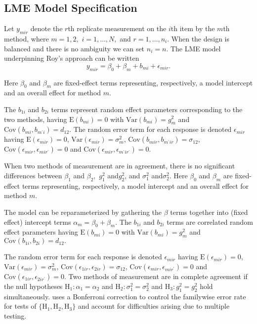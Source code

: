 \documentclass[12pt, a4paper]{report}
\theoremstyle{plain}
\theoremstyle{definition}
\theoremstyle{remark}
\begin{document}
	
	

	
	
	
	
	\subsection{LME Model Specification}
	
	Let $y_{mir} $ denote the $r$th replicate measurement on the $i$th item by the $m$th method, where $m=1,2,$ $i=1,\ldots,N,$ and $r = 1,\ldots,n_i.$ When the design is balanced and there is no ambiguity we can set $n_i=n.$ The LME model underpinning Roy's approach can be written
	\begin{equation}\label{Roy-model}
	y_{mir} = \beta_{0} + \beta_{m} + b_{mi} + \epsilon_{mir}.
	\end{equation}
	
	Here $\beta_0$ and $\beta_m$ are fixed-effect terms representing, respectively, a model intercept and an overall effect for method $m.$ 
	
	The $b_{1i}$ and $b_{2i}$ terms represent random effect parameters corresponding to the two methods, having $\mathrm{E}(b_{mi})=0$ with $\mathrm{Var}(b_{mi})=g^2_m$ and $\mathrm{Cov}(b_{mi}, b_{m^\prime i})=d_{12}.$ The random error term for each response is denoted $\epsilon_{mir}$ having $\mathrm{E}(\epsilon_{mir})=0$, $\mathrm{Var}(\epsilon_{mir})=\sigma^2_m$, $\mathrm{Cov}(b_{mir}, b_{m^\prime ir})=\sigma_{12}$, $\mathrm{Cov}(\epsilon_{mir}, \epsilon_{mir^\prime})= 0$ and $\mathrm{Cov}(\epsilon_{mir}, \epsilon_{m^\prime ir^\prime})= 0.$
	
	
	When two methods of measurement are in agreement, there is no significant differences between $\beta_1$ and $\beta_2,$ $g^2_1 $ and$ g^2_2$, and $\sigma^2_1 $ and$ \sigma^2_2$.
	Here $\beta_0$ and $\beta_m$ are fixed-effect terms representing, respectively, a model intercept and an overall effect for method $m.$ 
	
	The model can be reparameterized by gathering the $\beta$ terms together into (fixed effect) intercept terms $\alpha_m=\beta_0+\beta_m.$ The $b_{1i}$ and $b_{2i}$ terms are correlated random effect parameters having $\mathrm{E}(b_{mi})=0$ with $\mathrm{Var}(b_{mi})=g^2_m$ and $\mathrm{Cov}(b_{1i}, b_{2 i})=d_{12}.$ 
	
	The random error term for each response is denoted $\epsilon_{mir}$ having $\mathrm{E}(\epsilon_{mir})=0$, $\mathrm{Var}(\epsilon_{mir})=\sigma^2_m$, $\mathrm{Cov}(\epsilon_{1ir}, \epsilon_{2 ir})=\sigma_{12}$, $\mathrm{Cov}(\epsilon_{mir}, \epsilon_{mir^\prime})= 0$ and $\mathrm{Cov}(\epsilon_{1ir}, \epsilon_{2 ir^\prime})= 0.$ Two methods of measurement are in complete agreement if the null hypotheses $\mathrm{H}_1\colon \alpha_1 = \alpha_2$ and $\mathrm{H}_2\colon \sigma^2_1 = \sigma^2_2 $ and $\mathrm{H}_3\colon g^2_1= g^2_2$ hold simultaneously. \citet{ARoy2009} uses a Bonferroni correction to control the familywise error rate for tests of $\{\mathrm{H}_1, \mathrm{H}_2, \mathrm{H}_3\}$ and account for difficulties arising due to multiple testing. 
\end{document}
